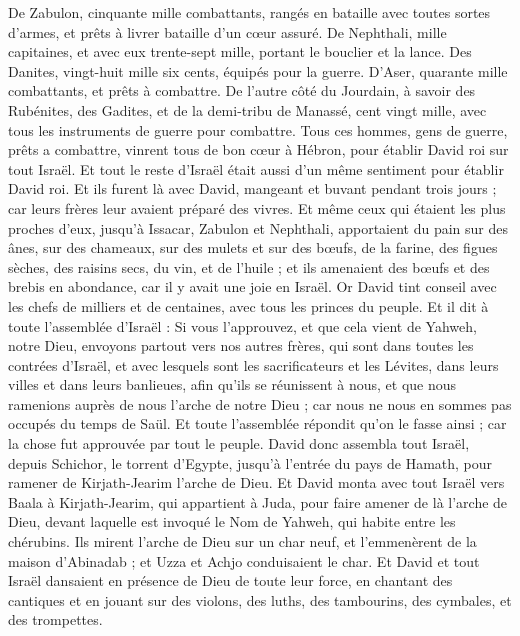 \begin{multicols}{2}
De Zabulon, cinquante mille combattants, rangés en bataille avec toutes sortes d'armes, et prêts à livrer bataille d’un cœur assuré.
De Nephthali, mille capitaines, et avec eux trente-sept mille, portant le bouclier et la lance.
Des Danites, vingt-huit mille six cents, équipés pour la guerre.
D'Aser, quarante mille combattants, et prêts à combattre.
De l’autre côté du Jourdain, à savoir des Rubénites, des Gadites, et de la demi-tribu de Manassé, cent vingt mille, avec tous les instruments de guerre pour combattre.
Tous ces hommes, gens de guerre, prêts a combattre, vinrent tous de bon cœur à Hébron, pour établir David roi sur tout Israël. Et tout le reste d'Israël était aussi d'un même sentiment pour établir David roi.
Et ils furent là avec David, mangeant et buvant pendant trois jours ; car leurs frères leur avaient préparé des vivres.
Et même ceux qui étaient les plus proches d'eux, jusqu'à Issacar, Zabulon et Nephthali, apportaient du pain sur des ânes, sur des chameaux, sur des mulets et sur des bœufs, de la farine, des figues sèches, des raisins secs, du vin, et de l'huile ; et ils amenaient des bœufs et des brebis en abondance, car il y avait une joie en Israël.
\VerseOne{}Or David tint conseil avec les chefs de milliers et de centaines, avec tous les princes du peuple.
Et il dit à toute l'assemblée d'Israël : Si vous l'approuvez, et que cela vient de Yahweh, notre Dieu, envoyons partout vers nos autres frères, qui sont dans toutes les contrées d'Israël, et avec lesquels sont les sacrificateurs et les Lévites, dans leurs villes et dans leurs banlieues, afin qu'ils se réunissent à nous,
et que nous ramenions auprès de nous l’arche de notre Dieu ; car nous ne nous en sommes pas occupés du temps de Saül.
Et toute l'assemblée répondit qu'on le fasse ainsi ; car la chose fut approuvée par tout le peuple.
David donc assembla tout Israël, depuis Schichor, le torrent d'Egypte, jusqu'à l'entrée du pays de Hamath, pour ramener de Kirjath-Jearim l’arche de Dieu.
Et David monta avec tout Israël vers Baala à Kirjath-Jearim, qui appartient à Juda, pour faire amener de là l’arche de Dieu, devant laquelle est invoqué le Nom de Yahweh, qui habite entre les chérubins.
Ils mirent l’arche de Dieu sur un char neuf, et l'emmenèrent de la maison d'Abinadab ; et Uzza et Achjo conduisaient le char.
Et David et tout Israël dansaient en présence de Dieu de toute leur force, en chantant des cantiques et en jouant sur des violons, des luths, des tambourins, des cymbales, et des trompettes.

\end{multicols}
